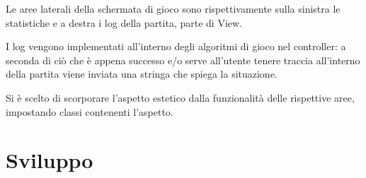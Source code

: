 \documentclass[a4paper,titlepage,12pt]{article}
\begin{document}
\par \noindent Le aree laterali della schermata di gioco sono rispettivamente sulla sinistra le statistiche e a destra i log della partita, parte di View.
\par \noindent I log vengono implementati all'interno degli algoritmi di gioco nel controller: a seconda di ciò che è appena successo e/o serve all'utente tenere traccia all'interno della partita viene inviata una stringa che spiega la situazione.
\par \noindent Si è scelto di scorporare l'aspetto estetico dalla funzionalità delle rispettive aree, impostando classi contenenti l'aspetto.

\newpage
\section{Sviluppo}
\end{document}
